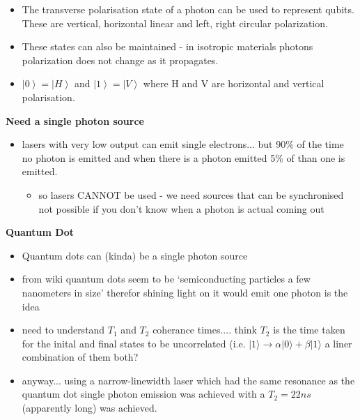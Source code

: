 \begin{itemize}
    \item The transverse polarisation state of a photon can be used to represent qubits. 
    These are vertical, horizontal linear and left, right circular polarization. \cite{bergou_quantum_2021}
    
    \item These states can also be maintained - in isotropic materials photons polarization does not change as it propagates. \cite{bergou_quantum_2021}
    
    \item $\left\vert 0 \right\rangle = \left\vert H\right\rangle $ and $\left\vert 1 \right\rangle = \left\vert V\right\rangle $ where H and V are horizontal and vertical polarisation. \cite{bergou_quantum_2021}

\end{itemize}
\vspace{1em}
{\bf Need a single photon source}
\begin{itemize}
    \item lasers with very low output can emit single electrons... but 90$\%$ of the time no photon is emitted and when there is a photon emitted 5$\%$ of than one is emitted.\cite{nielsen_quantum_2010}
    \begin{itemize}
        \item so lasers CANNOT be used - we need sources that can be synchronised not possible if you don't know when a photon is actual coming out
    \end{itemize}
\end{itemize}
\vspace{1em}
{\bf Quantum Dot}
\begin{itemize}
    \item Quantum dots can (kinda) be a single photon source
    \item from wiki quantum dots seem to be `semiconducting particles a few nanometers in size' therefor shining light on it would emit one photon is the idea
    \item need to understand $T_1$ and $T_2$ coherance times.... think $T_2$ is the time taken for the inital and final states to be uncorrelated (i.e. $|1\rangle \rightarrow \alpha |0\rangle + \beta |1\rangle$ a liner combination of them both?
    \item anyway... using a narrow-linewidth laser which had the same resonance as the quantum dot single photon emission was achieved with a $T_2=22ns$ (apparently long) was achieved. \cite{lodahl_interfacing_2015}
\end{itemize}
